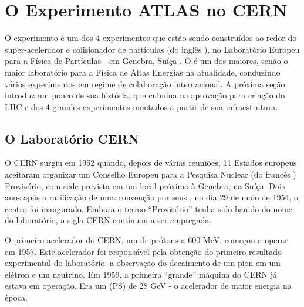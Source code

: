 \typeout{ ====================================================================}
\typeout{ ====================================================================}

\chapter{O Experimento ATLAS no CERN}
\label{chap:atlas}


O experimento  é um dos 4 experimentos que estão sendo construídos
ao redor do super-acelerador e colisionador de partículas  (do inglês
), no Laboratório Europeu para a Física de
Partículas -  em Genebra, Suíça \cite{atlas-tp}. O  é um
dos maiores, senão o maior laboratório para a Física de Altas Energias na
atualidade, conduzindo vários experimentos em regime de colaboração
internacional. A próxima seção introduz um pouco de sua história, que culmina
na aprovação para criação do LHC e dos 4 grandes experimentos montados a
partir de sua infraestrutura.

\section{O Laboratório CERN}

O CERN surgiu em 1952 quando, depois de várias reuniões, 11 Estados europeus
aceitaram organizar um Conselho Europeu para a Pesquisa Nuclear (do francês
) Provisório, com sede
prevista em um local próximo à Genebra, na Suíça. Dois anos após a ratificação
de uma convenção por seus , no dia 29 de maio de 1954, o
centro foi inaugurado. Embora o termo ``Provisório'' tenha sido banido do nome
do laboratório, a sigla CERN continuou a ser empregada.
 
O primeiro acelerador do CERN, um
 de prótons a 600 MeV, começou a operar em
1957. Este acelerador foi responsável pela obtenção do primeiro resultado
experimental do laboratório: a observação do decaimento de um píon em um
elétron e um neutrino. Em 1959, a primeira ``grande'' máquina do CERN já
estava em operação. Era um  (PS) de 28 GeV - o
acelerador de maior energia na época.

